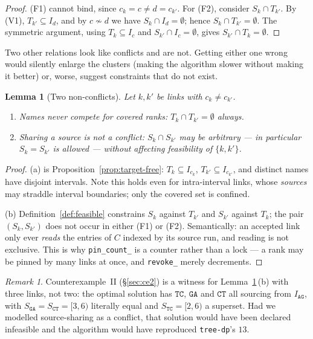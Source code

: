 \documentclass[11pt,a4paper]{article}
\theoremstyle{definition}
\theoremstyle{plain}
\newtheorem{lemma}[theorem]{Lemma}
\theoremstyle{remark}
\newtheorem{remark}{Remark}
\begin{document}
\begin{proof}
(F1) cannot bind, since $c_k = c \ne d = c_{k'}$. For (F2), consider
$S_k \cap T_{k'}$. By (V1), $T_{k'} \subseteq I_{d}$, and by
$c \not\sim d$ we have $S_k \cap I_{d} = \emptyset$; hence
$S_k \cap T_{k'} = \emptyset$. The symmetric argument, using
$T_k \subseteq I_c$ and $S_{k'} \cap I_c = \emptyset$, gives
$S_{k'} \cap T_k = \emptyset$.
\end{proof}

Two other relations look like conflicts and are not. Getting either one
wrong would silently enlarge the clusters (making the algorithm slower
without making it better) or, worse, suggest constraints that do not
exist.

\begin{lemma}[Two non-conflicts]
\label{lem:nonconflicts}
Let $k, k'$ be links with $c_k \ne c_{k'}$.
\begin{enumerate}
\item[(a)] \emph{Names never compete for covered ranks:}
  $T_k \cap T_{k'} = \emptyset$ always.
\item[(b)] \emph{Sharing a source is not a conflict:} $S_k \cap S_{k'}$
  may be arbitrary --- in particular $S_k = S_{k'}$ is allowed --- without
  affecting feasibility of $\{k,k'\}$.
\end{enumerate}
\end{lemma}

\begin{proof}
(a) is Proposition~\ref{prop:target-free}: $T_k \subseteq I_{c_k}$,
$T_{k'} \subseteq I_{c_{k'}}$, and distinct names have disjoint
intervals. Note this holds even for intra-interval links, whose
\emph{sources} may straddle interval boundaries; only the covered set is
confined.

(b) Definition~\ref{def:feasible} constrains $S_k$ against $T_{k'}$ and
$S_{k'}$ against $T_k$; the pair $(S_k, S_{k'})$ does not occur in either
(F1) or (F2). Semantically: an accepted link only ever \emph{reads} the
entries of $C$ indexed by its source run, and reading is not exclusive.
This is why \texttt{pin\_count\_} is a counter rather than a lock ---
a rank may be pinned by many links at once, and \texttt{revoke\_} merely
decrements.
\end{proof}

\begin{remark}
Counterexample~II (\S\ref{sec:ce2}) is a witness for
Lemma~\ref{lem:nonconflicts}\,(b) with three links, not two: the optimal
solution has $\mathtt{TC}$, $\mathtt{GA}$ and $\mathtt{CT}$ all sourcing
from $I_{\mathtt{AG}}$, with $S_{\mathtt{GA}} = S_{\mathtt{CT}} = [3,6)$
literally equal and $S_{\mathtt{TC}} = [2,6)$ a superset. Had we modelled
source-sharing as a conflict, that solution would have been declared
infeasible and the algorithm would have reproduced \texttt{tree-dp}'s
$13$.
\end{remark}
\end{document}
